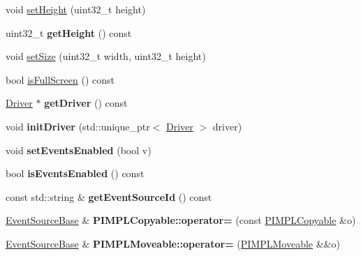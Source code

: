 \begin{DoxyCompactItemize}
\item 
void \hyperlink{a00082_a87b8b6f2c1a08327d4010e2b6aceb319}{set\+Height} (uint32\+\_\+t height)
\item 
uint32\+\_\+t {\bfseries get\+Height} () const \hypertarget{a00082_accdce871efc461fe3348d62f8087b73d}{}\label{a00082_accdce871efc461fe3348d62f8087b73d}

\item 
void \hyperlink{a00082_aefaae1015e22521e0a0168633a7d413f}{set\+Size} (uint32\+\_\+t width, uint32\+\_\+t height)
\item 
bool \hyperlink{a00082_a9429ac0c042cc998ecbedb1c13c0bc9a}{is\+Full\+Screen} () const 
\item 
\hyperlink{a00024}{Driver} $\ast$ {\bfseries get\+Driver} () const \hypertarget{a00082_ac793b7cdbbdd1d62df9dc64e4ed50b27}{}\label{a00082_ac793b7cdbbdd1d62df9dc64e4ed50b27}

\item 
void {\bfseries init\+Driver} (std\+::unique\+\_\+ptr$<$ \hyperlink{a00024}{Driver} $>$ driver)\hypertarget{a00082_a23c30f984006bdf0d2ceda4513ee12b9}{}\label{a00082_a23c30f984006bdf0d2ceda4513ee12b9}

\item 
void {\bfseries set\+Events\+Enabled} (bool v)\hypertarget{a00036_ae529242181c16462bef9bd6b8fb56b93}{}\label{a00036_ae529242181c16462bef9bd6b8fb56b93}

\item 
bool {\bfseries is\+Events\+Enabled} () const \hypertarget{a00036_a659325f18d666f132f380e4319499572}{}\label{a00036_a659325f18d666f132f380e4319499572}

\item 
const std\+::string \& {\bfseries get\+Event\+Source\+Id} () const \hypertarget{a00036_ad41deeb2b9de38797b10777e5d1ecf13}{}\label{a00036_ad41deeb2b9de38797b10777e5d1ecf13}

\item 
\hyperlink{a00036}{Event\+Source\+Base} \& {\bfseries P\+I\+M\+P\+L\+Copyable\+::operator=} (const \hyperlink{a00060}{P\+I\+M\+P\+L\+Copyable} \&o)\hypertarget{a00060_a26fdb9b3d449d04dc653c7ae942f452b}{}\label{a00060_a26fdb9b3d449d04dc653c7ae942f452b}

\item 
\hyperlink{a00036}{Event\+Source\+Base} \& {\bfseries P\+I\+M\+P\+L\+Moveable\+::operator=} (\hyperlink{a00061}{P\+I\+M\+P\+L\+Moveable} \&\&o)\hypertarget{a00061_ac67025e8a25edffe99fa9bf67ed8ca19}{}\label{a00061_ac67025e8a25edffe99fa9bf67ed8ca19}

\end{DoxyCompactItemize}
